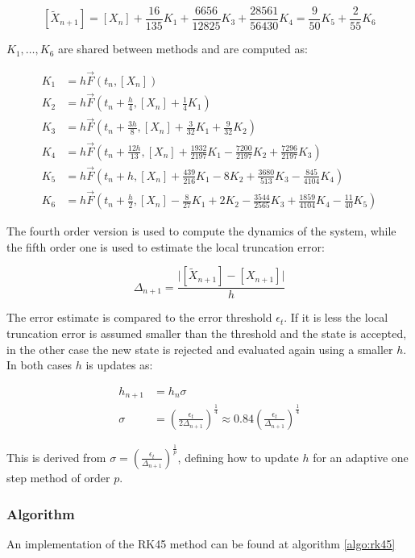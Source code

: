   $$[\tilde{X}_{n+1}] = [X_n] + \frac{16}{135}K_1 + \frac{6656}{12825}K_3 + \frac{28561}{56430}K_4 =\frac{9}{50}K_5 + \frac{2}{55}K_6$$

  $K_1,\dots, K_6$ are shared between methods and are computed as:

  \begin{align*}
    K_1 &=h\vec{F}(t_n, [X_n])\\
    K_2 &=h\vec{F}\left(t_n+\frac{h}{4}, [X_n]+\frac{1}{4}K_1\right)\\
    K_3 &=h\vec{F}\left(t_n+\frac{3h}{8}, [X_n]+\frac{3}{32}K_1+\frac{9}{32}K_2\right)\\
    K_4 &=h\vec{F}\left(t_n+\frac{12h}{13}, [X_n]+\frac{1932}{2197}K_1-\frac{7200}{2197}K_2+\frac{7296}{2197}K_3\right)\\
    K_5 &=h\vec{F}\left(t_n+h, [X_n]+\frac{439}{216}K_1-8K_2+\frac{3680}{513}K_3-\frac{845}{4104}K_4\right)\\
    K_6 &=h\vec{F}\left(t_n+\frac{h}{2}, [X_n]-\frac{8}{27}K_1+2K_2-\frac{3544}{2565}K_3+\frac{1859}{4104}K_4-\frac{11}{40}K_5\right)
  \end{align*}

  The fourth order version is used to compute the dynamics of the system, while the fifth order one is used to estimate the local truncation error:

  $$\Delta_{n+1} = \frac{\biggr\vert [\tilde{X}_{n+1}]-[X_{n+1}]\biggr\vert}{h}$$

  The error estimate is compared to the error threshold $\epsilon_t$.
  If it is less the local truncation error is assumed smaller than the threshold and the state is accepted, in the other case the new state is rejected and evaluated again using a smaller $h$.
  In both cases $h$ is updates as:

  \begin{align*}
    h_{n+1} &=h_n\sigma\\
    \sigma &= \left(\frac{\epsilon_t}{2\Delta_{n+1}}\right)^{\frac{1}{4}}\approx 0.84\left(\frac{\epsilon_t}{\Delta_{n+1}}\right)^{\frac{1}{4}}
  \end{align*}

  This is derived from $\sigma = \left(\frac{\epsilon_t}{\Delta_{n+1}}\right)^{\frac{1}{p}}$, defining how to update $h$ for an adaptive one step method of order $p$.

    \subsubsection{Algorithm}
    An implementation of the RK45 method can be found at algorithm \ref{algo:rk45}


